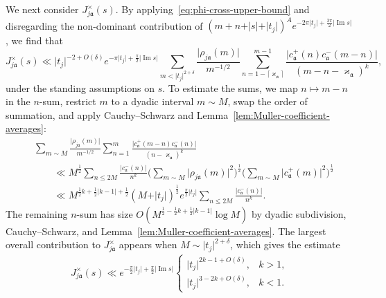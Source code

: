 \documentclass[11pt,reqno]{amsart}
\theoremstyle{plain}
\theoremstyle{definition}
\numberwithin{equation}{section}
\renewcommand{\Im}{\operatorname{Im}}
\begin{document}
We next consider $J_{j\mathfrak{a}}^\times(s)$. By applying~\eqref{eq:phi-cross-upper-bound} and disregarding the non-dominant contribution of $(m+n+ \vert s \vert + \vert t_j \vert)^A e^{-2\pi \vert t_j \vert + \frac{3\pi}{2} \vert \Im s \vert}$, we find that
\[
	J_{j\mathfrak{a}}^\times(s) \ll
		\vert t_j \vert^{-2+O(\delta)} e^{-\pi \vert t_j \vert + \frac{\pi}{2} \vert \Im s \vert} \!\!\!\!
		\sum_{m < \vert t_j \vert^{2+\delta}} \!\!\!\!
			\frac{\vert \rho_{j \mathfrak{a}}(m) \vert}{m^{-1/2}} \!\!\!\!
		\sum_{n=1-\lceil \varkappa_\mathfrak{a} \rceil}^{m-1} \!\!\!
		\frac{\vert c_\mathfrak{a}^+(n) c_\mathfrak{a}^-(m-n) \vert}{(m-n-\varkappa_\mathfrak{a})^k},
\]
under the standing assumptions on $s$. To estimate the sums, we map $n \mapsto m-n$ in the $n$-sum, restrict $m$ to a dyadic interval $m \sim M$, swap the order of summation, and apply Cauchy--Schwarz and Lemma~\ref{lem:Muller-coefficient-averages}:
\begin{align*}
	& \sum_{m \sim M} 
			\frac{\vert \rho_{j \mathfrak{a}}(m) \vert}{m^{-1/2}}
		\sum_{n=1}^{m}
		\frac{\vert c_\mathfrak{a}^+(m-n) c_\mathfrak{a}^-(n) \vert}{(n-\varkappa_\mathfrak{a})^k} \\
	& \qquad \ll
	M^{\frac{1}{2}} \sum_{n\leq 2M} \frac{\vert c_\mathfrak{a}^-(n) \vert}{n^k}
		\Big(\sum_{m \sim M} \vert \rho_{j\mathfrak{a}}(m) \vert^2\Big)^{\frac{1}{2}}
		\Big(\sum_{m \sim M} \vert c_\mathfrak{a}^+(m) \vert^2\Big)^{\frac{1}{2}} \\
	& \qquad \ll
	M^{\frac{1}{2} k + \frac{1}{2} \vert k -1 \vert + \frac{1}{2}}
		(M+ \vert t_j \vert)^{\frac{1}{2}} e^{\frac{\pi}{2} \vert t_j \vert} 
		\sum_{n\leq 2M} \frac{\vert c_\mathfrak{a}^-(n) \vert}{n^k}.
\end{align*}
The remaining $n$-sum has size $O(M^{\frac{1}{2}-\frac{1}{2} k + \frac{1}{2} \vert k -1 \vert} \log M)$ by dyadic subdivision, Cauchy--Schwarz, and Lemma~\ref{lem:Muller-coefficient-averages}.
The largest overall contribution to $J_{j\mathfrak{a}}^\times$ appears when $M \sim \vert t_j \vert^{2+\delta}$, which gives the estimate
\begin{align} \label{eq:J-cross-upper-bound}
	J_{j\mathfrak{a}}^\times(s) \ll
	e^{-\frac{\pi}{2} \vert t_j \vert + \frac{\pi}{2} \vert \Im s \vert}
	\begin{cases}
		\vert t_j \vert^{2k-1+O(\delta)}, & k > 1, \\
		\vert t_j \vert^{3-2k + O(\delta)}, & k <1.
	\end{cases}
\end{align}
\end{document}
